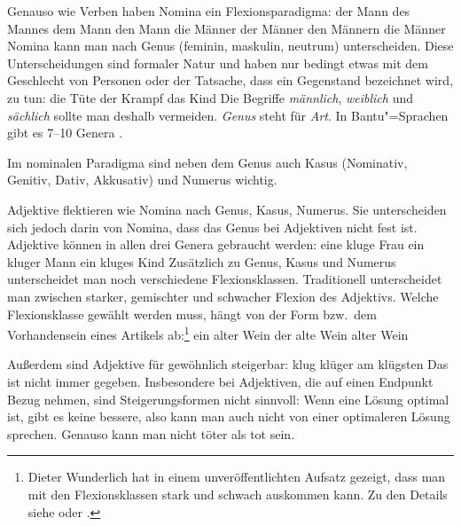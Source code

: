 \documentclass[ number=45
			   ,series=eotms
			   ,printondemand
			  ]{langsci}
\let\citew=\citealp
\begin{document}
{Genauso wie Verben haben Nomina ein Flexionsparadigma:
\eal
\ex der Mann
\ex des Mannes
\ex dem Mann
\ex den Mann
\ex die Männer
\ex der Männer
\ex den Männern
\ex die Männer
\zl
Nomina kann man nach Genus (feminin, maskulin, neutrum) unterscheiden. Diese Unterscheidungen sind
formaler Natur und haben nur bedingt etwas mit dem Geschlecht von Personen oder der Tatsache, dass ein
Gegenstand bezeichnet wird, zu tun:
\eal
\ex die Tüte
\ex der Krampf
\ex das Kind
\zl
Die Begriffe \emph{männlich}, \emph{weiblich} und \emph{sächlich} sollte man deshalb vermeiden.
\emph{Genus} steht für \emph{Art}. In Bantu"=Sprachen gibt es 7--10 Genera \citep{Corbett2008a}.

Im nominalen Paradigma sind neben dem Genus auch Kasus (Nominativ,
Genitiv, Dativ, Akkusativ) und Numerus wichtig. 

Adjektive flektieren wie Nomina nach Genus, Kasus, Numerus. Sie unterscheiden sich jedoch darin von
Nomina, dass das Genus bei Adjektiven nicht fest ist. Adjektive können in allen drei Genera
gebraucht werden:
\eal
\ex eine kluge Frau
\ex ein kluger Mann
\ex ein kluges Kind
\zl
Zusätzlich zu Genus, Kasus und Numerus unterscheidet man noch verschiedene
Flexionsklassen. Traditionell unterscheidet man zwischen starker, gemischter und schwacher Flexion
des Adjektivs. Welche Flexionsklasse\label{page-Flexionsklasse-Wunderlich}
gewählt werden muss, hängt von der Form bzw.\ dem Vorhandensein eines Artikels ab:\footnote{
Dieter Wunderlich hat in einem unveröffentlichten Aufsatz gezeigt, dass
man mit den Flexionsklassen stark und schwach auskommen kann. Zu den Details siehe
\citew[Abschnitt~2.2.5]{ps2} oder \citew[Abschnitt~13.2]{MuellerLehrbuch1}. 
}
\eal
\ex ein alter Wein
\ex der alte Wein
\ex alter Wein
\zl

\noindent
Außerdem sind Adjektive für gewöhnlich steigerbar:
\eal
\ex klug
\ex klüger
\ex am klügsten
\zl
Das ist nicht immer gegeben. Insbesondere bei Adjektiven, die auf einen Endpunkt Bezug nehmen, sind
Steigerungsformen nicht sinnvoll: Wenn eine Lösung optimal ist, gibt es keine bessere, also kann man
auch nicht von einer optimaleren Lösung sprechen. Genauso kann man nicht töter als tot sein. 
%

}
\end{document}
